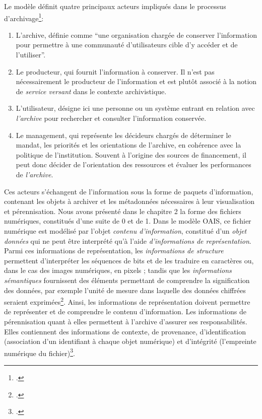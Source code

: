Le modèle définit quatre principaux acteurs impliqués dans le processus d'archivage\footcite[pp.41-44]{banat-bergerArchivageNumeriqueLong2009}: 

\begin{enumerate}
\item L'archive, définie comme \enquote{une organisation chargée de conserver l'information pour permettre à une communauté d'utilisateurs cible d'y accéder et de l'utiliser}.
\item Le producteur, qui fournit l'information à conserver. Il n'est pas nécessairement le producteur de l'information et est plutôt associé à la notion de \emph{service versant} dans le contexte archivistique.
\item L'utilisateur, désigne ici une personne ou un système entrant en relation avec \emph{l'archive} pour rechercher et consulter l'information conservée.
\item Le management, qui représente les décideurs chargés de déterminer le mandat, les priorités et les orientations de l'archive, en cohérence avec la politique de l'institution. Souvent à l'origine des sources de financement, il peut donc décider de l'orientation des ressources et évaluer les performances de \emph{l'archive}.
  \end{enumerate}


Ces acteurs s'échangent de l'information sous la forme de paquets d’information, contenant les objets à archiver et les métadonnées nécessaires à leur visualisation et pérennisation. Nous avons présenté dans le chapitre 2 la forme des fichiers numériques, constitués d'une suite de 0 et de 1. Dans le modèle OAIS, ce fichier numérique est modélisé par l'objet \emph{contenu d'information}, constitué d'un \emph{objet données} qui ne peut être interprété qu'à l'aide \emph{d'informations de représentation}. Parmi ces informations de représentation, les \emph{informations de structure} permettent d'interpréter les séquences de bits et de les traduire en caractères ou, dans le cas des images numériques, en pixels ; tandis que les \emph{informations sémantiques} fournissent des éléments permettant de comprendre la signification des données, par exemple l'unité de mesure dans laquelle des données chiffrées seraient exprimées\footcite[p.45]{banat-bergerArchivageNumeriqueLong2009}. Ainsi, les informations de représentation doivent permettre de représenter et de comprendre le contenu d'information. Les informations de pérennisation quant à elles permettent à l'archive d'assurer ses responsabilités. Elles contiennent des informations de contexte, de provenance, d'identification (association d'un identifiant à chaque objet numérique) et d'intégrité (l'empreinte numérique du fichier)\footcite[pp.48-49]{banat-bergerArchivageNumeriqueLong2009}. 


